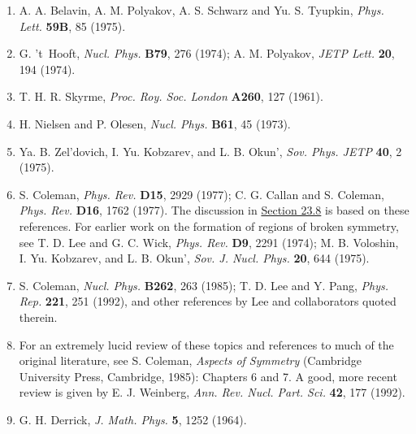 \begin{enumerate}
\item {}\label{ch23-ref-1}
A. A. Belavin, A. M. Polyakov, A. S. Schwarz and Yu. S. Tyupkin,
\emph{Phys. Lett.} \textbf{59B}, 85 (1975).

\item {}\label{ch23-ref-2}
G. 't~Hooft, \emph{Nucl. Phys.} \textbf{B79}, 276 (1974);
A. M. Polyakov, \emph{JETP Lett.} \textbf{20}, 194 (1974).

\item {}\label{ch23-ref-3}
T. H. R. Skyrme, \emph{Proc. Roy. Soc. London} \textbf{A260}, 127
(1961).

\item {}\label{ch23-ref-4}
H. Nielsen and P. Olesen, \emph{Nucl. Phys.} \textbf{B61}, 45 (1973).

\item {}\label{ch23-ref-5}
Ya. B. Zel'dovich, I. Yu. Kobzarev, and L. B. Okun',
\emph{Sov. Phys. JETP} \textbf{40}, 2 (1975).

\item {}\label{ch23-ref-6}
S. Coleman, \emph{Phys. Rev.} \textbf{D15}, 2929 (1977);
C. G. Callan and S. Coleman, \emph{Phys. Rev.} \textbf{D16}, 1762
(1977). The discussion in \hyperref[sec:23.8]{Section 23.8} is based on
these references. For earlier work on the formation of regions of broken
symmetry, see T. D. Lee and G. C. Wick, \emph{Phys. Rev.} \textbf{D9},
2291 (1974); M. B. Voloshin, I. Yu. Kobzarev, and L. B. Okun',
\emph{Sov. J. Nucl. Phys.} \textbf{20}, 644 (1975).

\item {}\label{ch23-ref-7}
S. Coleman, \emph{Nucl. Phys.} \textbf{B262}, 263 (1985);
T. D. Lee and Y. Pang, \emph{Phys. Rep.} \textbf{221}, 251 (1992),
and other references by Lee and collaborators quoted therein.

\item {}\label{ch23-ref-8}
For an extremely lucid review of these topics and references to much of
the original literature, see S. Coleman, \emph{Aspects of Symmetry}
(Cambridge University Press, Cambridge, 1985): Chapters 6 and 7. A good,
more recent review is given by E. J. Weinberg, \emph{Ann. Rev. Nucl.
Part. Sci.} \textbf{42}, 177 (1992).

\item {}\label{ch23-ref-9}
G. H. Derrick, \emph{J. Math. Phys.} \textbf{5}, 1252 (1964).


\end{enumerate}
